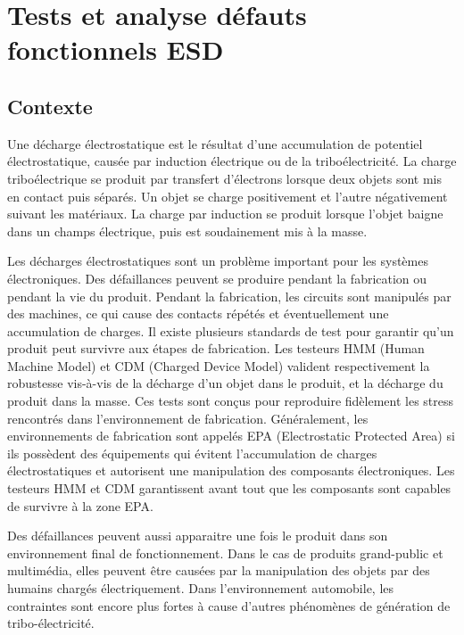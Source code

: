 \chapter{Tests et analyse défauts fonctionnels ESD}
\label{chap:1}
\section{Contexte}

Une décharge électrostatique est le résultat d'une accumulation de potentiel électrostatique, causée par induction électrique ou de la triboélectricité.
La charge triboélectrique se produit par transfert d'électrons lorsque deux objets sont mis en contact puis séparés.
Un objet se charge positivement et l'autre négativement suivant les matériaux.
La charge par induction se produit lorsque l'objet baigne dans un champs électrique, puis est soudainement mis à la masse.

Les décharges électrostatiques sont un problème important pour les systèmes électroniques.
Des défaillances peuvent se produire pendant la fabrication ou pendant la vie du produit.
Pendant la fabrication, les circuits sont manipulés par des machines, ce qui cause des contacts répétés et éventuellement une accumulation de charges.
Il existe plusieurs standards de test pour garantir qu'un produit peut survivre aux étapes de fabrication.
Les testeurs HMM (Human Machine Model) et CDM (Charged Device Model) valident respectivement la robustesse vis-à-vis de la décharge d'un objet dans le produit, et la décharge du produit dans la masse.
Ces tests sont conçus pour reproduire fidèlement les stress rencontrés dans l'environnement de fabrication.
Généralement, les environnements de fabrication sont appelés EPA (Electrostatic Protected Area) si ils possèdent des équipements qui évitent l'accumulation de charges électrostatiques et autorisent une manipulation des composants électroniques.
Les testeurs HMM et CDM garantissent avant tout que les composants sont capables de survivre à la zone EPA.

Des défaillances peuvent aussi apparaitre une fois le produit dans son environnement final de fonctionnement.
Dans le cas de produits grand-public et multimédia, elles peuvent être causées par la manipulation des objets par des humains chargés électriquement.
Dans l'environnement automobile, les contraintes sont encore plus fortes à cause d'autres phénomènes de génération de tribo-électricité.

